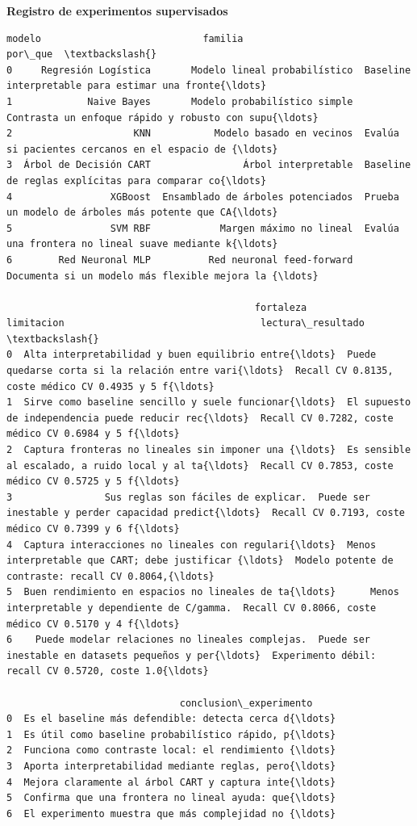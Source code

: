 \documentclass[11pt]{article}
\begin{document}
    \textbf{Registro de experimentos supervisados}

    
    
    \begin{Verbatim}[commandchars=\\\{\}]
                   modelo                            familia                                            por\_que  \textbackslash{}
0     Regresión Logística       Modelo lineal probabilístico  Baseline interpretable para estimar una fronte{\ldots}   
1             Naive Bayes       Modelo probabilístico simple  Contrasta un enfoque rápido y robusto con supu{\ldots}   
2                     KNN           Modelo basado en vecinos  Evalúa si pacientes cercanos en el espacio de {\ldots}   
3  Árbol de Decisión CART                Árbol interpretable  Baseline de reglas explícitas para comparar co{\ldots}   
4                 XGBoost  Ensamblado de árboles potenciados  Prueba un modelo de árboles más potente que CA{\ldots}   
5                 SVM RBF            Margen máximo no lineal  Evalúa una frontera no lineal suave mediante k{\ldots}   
6        Red Neuronal MLP          Red neuronal feed-forward  Documenta si un modelo más flexible mejora la {\ldots}   

                                           fortaleza                                         limitacion                                  lectura\_resultado  \textbackslash{}
0  Alta interpretabilidad y buen equilibrio entre{\ldots}  Puede quedarse corta si la relación entre vari{\ldots}  Recall CV 0.8135, coste médico CV 0.4935 y 5 f{\ldots}   
1  Sirve como baseline sencillo y suele funcionar{\ldots}  El supuesto de independencia puede reducir rec{\ldots}  Recall CV 0.7282, coste médico CV 0.6984 y 5 f{\ldots}   
2  Captura fronteras no lineales sin imponer una {\ldots}  Es sensible al escalado, a ruido local y al ta{\ldots}  Recall CV 0.7853, coste médico CV 0.5725 y 5 f{\ldots}   
3                Sus reglas son fáciles de explicar.  Puede ser inestable y perder capacidad predict{\ldots}  Recall CV 0.7193, coste médico CV 0.7399 y 6 f{\ldots}   
4  Captura interacciones no lineales con regulari{\ldots}  Menos interpretable que CART; debe justificar {\ldots}  Modelo potente de contraste: recall CV 0.8064,{\ldots}   
5  Buen rendimiento en espacios no lineales de ta{\ldots}      Menos interpretable y dependiente de C/gamma.  Recall CV 0.8066, coste médico CV 0.5170 y 4 f{\ldots}   
6    Puede modelar relaciones no lineales complejas.  Puede ser inestable en datasets pequeños y per{\ldots}  Experimento débil: recall CV 0.5720, coste 1.0{\ldots}   

                              conclusion\_experimento  
0  Es el baseline más defendible: detecta cerca d{\ldots}  
1  Es útil como baseline probabilístico rápido, p{\ldots}  
2  Funciona como contraste local: el rendimiento {\ldots}  
3  Aporta interpretabilidad mediante reglas, pero{\ldots}  
4  Mejora claramente al árbol CART y captura inte{\ldots}  
5  Confirma que una frontera no lineal ayuda: que{\ldots}  
6  El experimento muestra que más complejidad no {\ldots}  
    \end{Verbatim}
\end{document}
